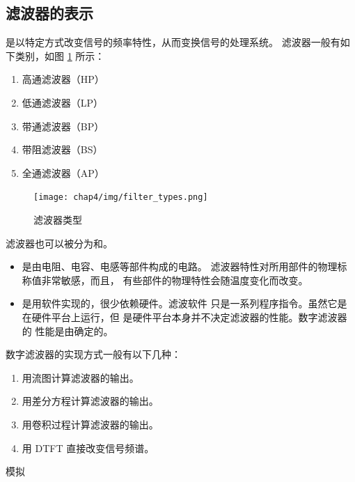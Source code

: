 \subsection{滤波器的表示}

\begin{definition}
    是以特定方式改变信号的频率特性，从而变换信号的处理系统。
    滤波器一般有如下类别，如图 \ref{fig:filter_types} 所示：
    \begin{enumerate}[label=(\arabic*)]
        \item 高通滤波器（HP）
        \item 低通滤波器（LP）
        \item 带通滤波器（BP）
        \item 带阻滤波器（BS）
        \item 全通滤波器（AP）
    \end{enumerate}
    \begin{figure}[H]
        \centering
        \texttt{[image: chap4/img/filter\_types.png]}
        \caption{滤波器类型}
        \label{fig:filter_types}
    \end{figure}

    滤波器也可以被分为和。
    \begin{itemize}
        \item {}是由电阻、电容、电感等部件构成的电路。
            滤波器特性对所用部件的物理标称值非常敏感，而且，
            有些部件的物理特性会随温度变化而改变。
        \item {}是用软件实现的，很少依赖硬件。滤波软件
            只是一系列程序指令。虽然它是在硬件平台上运行，但
            是硬件平台本身并不决定滤波器的性能。数字滤波器的
            性能是由确定的。
    \end{itemize}
    数字滤波器的实现方式一般有以下几种：
    \begin{enumerate}
        \item 用流图计算滤波器的输出。
        \item 用差分方程计算滤波器的输出。
        \item 用卷积过程计算滤波器的输出。
        \item 用 DTFT 直接改变信号频谱。
    \end{enumerate}
\end{definition}

\begin{definition}
    模拟
\end{definition}

